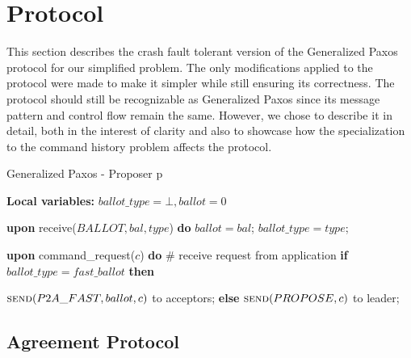 \section{Protocol} 

This section describes the crash fault tolerant version of the Generalized Paxos protocol for our simplified problem. The only modifications applied to the protocol were made to make it simpler while still ensuring its correctness. The protocol should still be recognizable as Generalized Paxos since its message pattern and control flow remain the same. However, we chose to describe it in detail, both in the interest of clarity and also to showcase how the specialization to the command history problem affects the protocol.

\begin{algorithm}[h] 
	\caption{Generalized Paxos - Proposer p}
	\textbf{Local variables:} $ballot\_type = \bot, ballot = 0 $
	\begin{algorithmic}[1]
		
		\State \textbf{upon} receive($BALLOT, bal, type$) \textbf{do} 
		\State \hspace{\algorithmicindent} 
		$ballot = bal$;
		\State \hspace{\algorithmicindent} 
		$ballot\_type = type$;
		\State
		
		\State \textbf{upon} command\_request($c$) \textbf{do}   \hspace{\algorithmicindent}\hspace{\algorithmicindent}\hspace{\algorithmicindent}\# receive request from application
		\State \hspace{\algorithmicindent} \textbf{if} $ballot\_type = fast\_ballot$ \textbf{then}
		
		\State \hspace{\algorithmicindent}\hspace{\algorithmicindent} $\Call{send}{P2A\_FAST, ballot, c}$ to acceptors;
		\State \hspace{\algorithmicindent} \textbf{else} 
		\State \hspace{\algorithmicindent}\hspace{\algorithmicindent} $\Call{send}{PROPOSE, c}$ to leader;		
	\end{algorithmic}
\end{algorithm}

\subsection{Agreement Protocol} 

